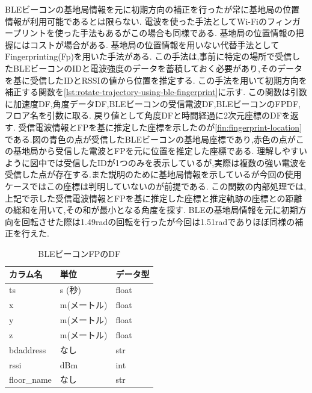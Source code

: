 BLEビーコンの基地局情報を元に初期方向の補正を行ったが常に基地局の位置情報が利用可能であるとは限らない.
電波を使った手法としてWi-Fiのフィンガープリントを使った手法もあるがこの場合も同様である.
基地局の位置情報の把握にはコストが場合がある.
基地局の位置情報を用いない代替手法としてFingerprinting(Fp)を用いた手法がある.
この手法は,事前に特定の場所で受信したBLEビーコンのIDと電波強度のデータを蓄積しておく必要があり,そのデータを基に受信したIDとRSSIの値から位置を推定する.
この手法を用いて初期方向を補正する関数を\ref{lst:rotate-trajectory-using-ble-fingerprint}に示す.
この関数は引数に加速度DF,角度データDF,BLEビーコンの受信電波DF,BLEビーコンのFPDF,フロア名を引数に取る.
戻り値として角度DFと時間経過に2次元座標のDFを返す.
受信電波情報とFPを基に推定した座標を示したのが\ref{fin:fingerprint-location}である.図の青色の点が受信したBLEビーコンの基地局座標であり,赤色の点がこの基地局から受信した電波とFPを元に位置を推定した座標である.
理解しやすいように図中では受信したIDが1つのみを表示しているが,実際は複数の強い電波を受信した点が存在する.また説明のために基地局情報を示しているが今回の使用ケースではこの座標は判明していないのが前提である.
この関数の内部処理では,上記で示した受信電波情報とFPを基に推定した座標と推定軌跡の座標との距離の総和を用いて,その和が最小となる角度を探す.
BLEの基地局情報を元に初期方向を回転させた際は1.49radの回転を行ったが今回は1.51radでありほぼ同様の補正を行えた.


\begin{table}[ht]
	\centering
	\begin{tabular}{lll}
		\toprule
		カラム名        & 単位      & データ型  \\
		\midrule
		ts          & s (秒)   & float \\
		x           & m(メートル) & float \\
		y           & m(メートル) & float \\
		z           & m(メートル) & float \\
		bdaddress   & なし      & str   \\
		rssi        & dBm     & int   \\
		floor\_name & なし      & str   \\
		\bottomrule
	\end{tabular}
	\caption{BLEビーコンFPのDF}
	\label{table:ble-beacon-fingerprint-df}
\end{table}


